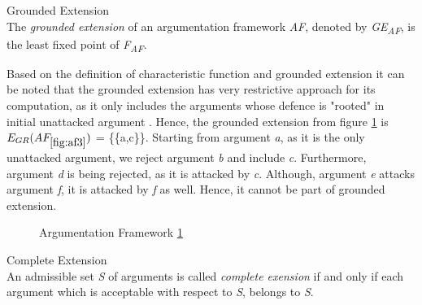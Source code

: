\begin{definition}{Grounded Extension}
\label{def:groundedExtension}\\
The \textit{grounded extension} of an argumentation framework \textit{AF}, denoted by \textit{GE\textsubscript{AF}}, is the least fixed point of \textit{F\textsubscript{AF}}.
\end{definition}

Based on the definition of characteristic function and grounded extension it can be noted that the grounded extension has very restrictive approach for its computation, as it only includes the arguments whose defence is "rooted" in initial unattacked argument \citep{baroni2009semantics}. Hence, the grounded extension from figure \ref{fig:af3} is \textit{$E_{GR}(AF_{\ref{fig:af3}})$} = \{\{a,c\}\}. Starting from argument \textit{a}, as it is the only unattacked argument, we reject argument \textit{b} and include \textit{c}. Furthermore, argument \textit{d} is being rejected, as it is attacked by \textit{c}. Although, argument \textit{e} attacks argument \textit{f}, it is attacked by \textit{f} as well. Hence, it cannot be part of grounded extension.

\begin{figure}[h]
\centering
{}
\caption{Argumentation Framework \ref{fig:af3}}
\label{fig:af3}
\end{figure}

\begin{definition}{Complete Extension}
\label{def:completeExtension}\\
An admissible set \textit{S} of arguments is called \textit{complete exension} if and only if each argument which is acceptable with respect to \textit{S}, belongs to \textit{S}.
\end{definition}

